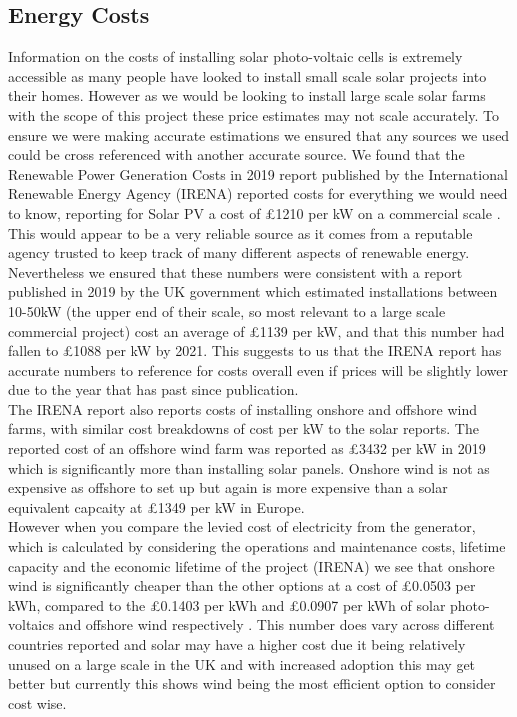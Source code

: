 \documentclass[twoside]{article}
\begin{document}
\subsection{Energy Costs}
Information on the costs of installing solar photo-voltaic cells is extremely accessible as many people have looked to install small scale solar projects into their homes. However as we would be looking to install large scale solar farms with the scope of this project these price estimates may not scale accurately. To ensure we were making accurate estimations we ensured that any sources we used could be cross referenced with another accurate source. We found that the Renewable Power Generation Costs in 2019 report published by the International Renewable Energy Agency (IRENA) reported costs for everything we would need to know, reporting for Solar PV a cost of £1210 per kW on a commercial scale \cite{irena}. This would appear to be a very reliable source as it comes from a reputable agency trusted to keep track of many different aspects of renewable energy. Nevertheless we ensured that these numbers were consistent with a report published in 2019 by the UK government which estimated installations between 10-50kW (the upper end of their scale, so most relevant to a large scale commercial project) cost an average of £1139 per kW, and that this number had fallen to £1088 per kW by 2021.\cite{department_for_business_2021} This suggests to us that the IRENA report has accurate numbers to reference for costs overall even if prices will be slightly lower due to the year that has past since publication.
\\
\noindent The IRENA report also reports costs of installing onshore and offshore wind farms, with similar cost breakdowns of cost per kW to the solar reports. The reported cost of an offshore wind farm was reported as £3432 per kW in 2019 which is significantly more than installing solar panels. Onshore wind is not as expensive as offshore to set up but again is more expensive than a solar equivalent capcaity at £1349 per kW in Europe.\cite{irena}\\
However when you compare the levied cost of electricity from the generator, which is calculated by considering the operations and maintenance costs, lifetime capacity and the economic lifetime of the project (IRENA) we see that onshore wind is significantly cheaper than the other options at a cost of £0.0503 per kWh, compared to the £0.1403 per kWh and £0.0907 per kWh of solar photo-voltaics and offshore wind respectively \cite{irena}. This number does vary across different countries reported and solar may have a higher cost due it being relatively unused on a large scale in the UK and with increased adoption this may get better but currently this shows wind being the most efficient option to consider cost wise.
\end{document}
